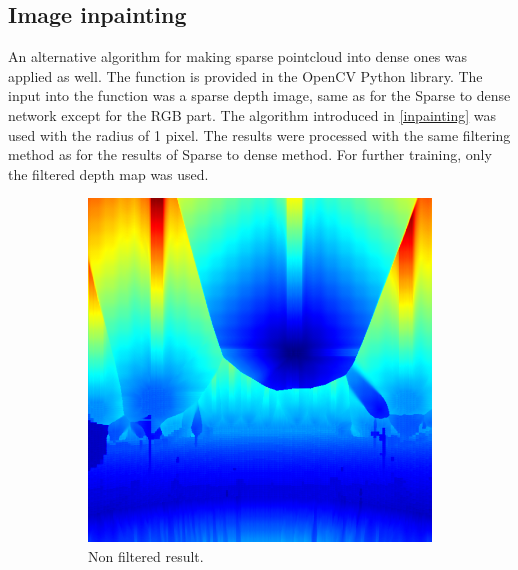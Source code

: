 \documentclass[twoside]{ctuthesis}
\theoremstyle{plain}
\theoremstyle{definition}
\theoremstyle{note}
\begin{document}
\subsection{Image inpainting}
An alternative algorithm for making sparse pointcloud into dense ones was applied as well. The function is provided in the OpenCV Python library. The input into the function was a sparse depth image, same as for the Sparse to dense network except for the RGB part. The algorithm introduced in \ref{inpainting} was used with the radius of 1 pixel. The results were processed with the same filtering method as for the results of Sparse to dense method. For further training, only the filtered depth map was used.
\begin{figure}
	\centering
	\begin{subfigure}[b]{0.3\textwidth}
		\centering
		\includegraphics[width=\textwidth]{raw_inpaint.png}
		\caption{Non filtered result.}
	\end{subfigure}
	\hfill
	\begin{subfigure}[b]{0.3\textwidth}
		\centering

\end{subfigure}
\end{figure}
\end{document}
